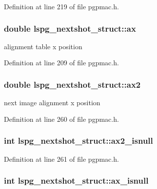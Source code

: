 Definition at line 219 of file pgpmac.h.\hypertarget{structlspg__nextshot__struct_a7f57874223897ab7d9c7531a9522904d}{
\subsubsection[{ax}]{\setlength{\rightskip}{0pt plus 5cm}double {\bf lspg\_\-nextshot\_\-struct::ax}}}
\label{structlspg__nextshot__struct_a7f57874223897ab7d9c7531a9522904d}


alignment table x position 

Definition at line 209 of file pgpmac.h.\hypertarget{structlspg__nextshot__struct_ab76bd38d2a098bc7eda82aff5dcb9c66}{
\subsubsection[{ax2}]{\setlength{\rightskip}{0pt plus 5cm}double {\bf lspg\_\-nextshot\_\-struct::ax2}}}
\label{structlspg__nextshot__struct_ab76bd38d2a098bc7eda82aff5dcb9c66}


next image alignment x position 

Definition at line 260 of file pgpmac.h.\hypertarget{structlspg__nextshot__struct_a846845b0b9ecf6517ef85554771ec71d}{
\subsubsection[{ax2\_\-isnull}]{\setlength{\rightskip}{0pt plus 5cm}int {\bf lspg\_\-nextshot\_\-struct::ax2\_\-isnull}}}
\label{structlspg__nextshot__struct_a846845b0b9ecf6517ef85554771ec71d}


Definition at line 261 of file pgpmac.h.\hypertarget{structlspg__nextshot__struct_aae46c7911b2b218497ad4a68f3dbb7d9}{
\subsubsection[{ax\_\-isnull}]{\setlength{\rightskip}{0pt plus 5cm}int {\bf lspg\_\-nextshot\_\-struct::ax\_\-isnull}}}
\label{structlspg__nextshot__struct_aae46c7911b2b218497ad4a68f3dbb7d9}


